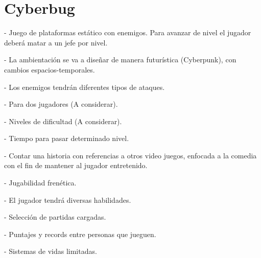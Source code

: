 \documentclass{article}
\begin{document}
\section{Cyberbug}
    \begin{flushleft}
    
    -    Juego de plataformas estático con enemigos.  Para avanzar de nivel el jugador deberá matar a un jefe por nivel. 
    \vspace*{1cm}
    
    -    La ambientación se va a diseñar de manera futurística (Cyberpunk), con cambios espacios-temporales.
    \vspace*{1cm}
    
    -    Los enemigos tendrán diferentes tipos de ataques.
    \vspace*{1cm}
    
    -    Para dos jugadores (A considerar). 
    \vspace*{1cm}
    
    -    Niveles de dificultad (A considerar). 
    \vspace*{1cm}
    
    -    Tiempo para pasar determinado nivel. 
    \vspace*{1cm}
    
    -    Contar una historia con referencias a otros video juegos, enfocada a la comedia con el fin de mantener al jugador entretenido. 
    \vspace*{1cm}
    
    -    Jugabilidad frenética. 
    \vspace*{1cm}
    
    -    El jugador tendrá diversas habilidades. 
    \vspace*{1cm}
    
    -    Selección de partidas cargadas. 
    \vspace*{1cm}
    
    -    Puntajes y records entre personas que jueguen.
    \vspace*{1cm}
    
    -    Sistemas de vidas limitadas.
    \vspace*{1cm}
    
    \end{flushleft}
\end{document}
